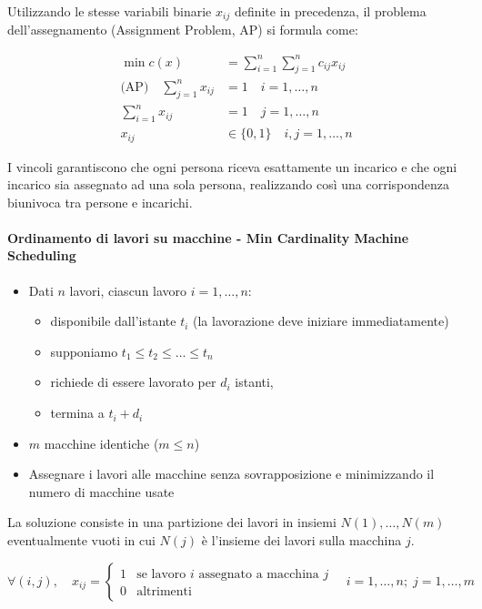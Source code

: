 \documentclass[12pt]{extarticle} %
\begin{document}
Utilizzando le stesse variabili binarie $x_{ij}$ definite in precedenza, il problema dell'assegnamento (Assignment Problem, AP) si formula come:

\[
\begin{aligned}
\min c(x) &= \sum_{i=1}^{n} \sum_{j=1}^{n} c_{ij} x_{ij} \\
\text{(AP)} \quad \sum_{j=1}^{n} x_{ij} &= 1 \quad i = 1, \dots, n \\
\sum_{i=1}^{n} x_{ij} &= 1 \quad j = 1, \dots, n \\
x_{ij} &\in \{0,1\} \quad i, j = 1, \dots, n
\end{aligned}
\]

I vincoli garantiscono che ogni persona riceva esattamente un incarico e che ogni incarico sia assegnato ad una sola persona, realizzando così una corrispondenza biunivoca tra persone e incarichi.

\paragraph{Ordinamento di lavori su macchine - Min Cardinality Machine Scheduling}
\begin{itemize}
    \item Dati $n$ lavori, ciascun lavoro $i = 1, \ldots, n$:
    \begin{itemize}
        \item disponibile dall'istante $t_i$ (la lavorazione deve iniziare immediatamente)
        \item supponiamo $t_1 \leq t_2 \leq \ldots \leq t_n$
        \item richiede di essere lavorato per $d_i$ istanti,
        \item termina a $t_i + d_i$
    \end{itemize}
    \item $m$ macchine identiche ($m \leq n$)
    \item Assegnare i lavori alle macchine senza sovrapposizione e minimizzando il numero di macchine usate
\end{itemize}
La soluzione consiste in una partizione dei lavori in insiemi $N(1), \ldots, N(m)$ eventualmente vuoti in cui $N(j)$ è l'insieme dei lavori sulla macchina $j$.

\[
\forall(i,j), \quad x_{ij} = \begin{cases}
1 & \text{se lavoro } i \text{ assegnato a macchina } j \\
0 & \text{altrimenti}
\end{cases}
\quad i = 1, \dots, n; \; j = 1, \dots, m
\]
\end{document}
